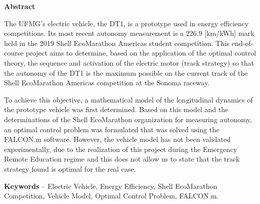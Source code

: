 
\begin{center}
\huge{{\bf Abstract}}
\vspace{2cm}
\end{center}

The UFMG's electric vehicle, the DT1, is a prototype used in energy efficiency competitions. 
Its most recent autonomy measurement is a $226.9$ [km/kWh] mark held in the 2019 Shell EcoMarathon Americas student competition. 
This end-of-course project aims to determine, based on the application of the optimal control theory, the sequence and activation of the electric motor 
(track strategy) so that the autonomy of the DT1 is the maximum possible on the current track of the Shell EcoMarathon Americas competition at the Sonoma raceway.

To achieve this objective, a mathematical model of the longitudinal dynamics of the prototype vehicle was first determined. 
Based on this model and the determinations of the Shell EcoMarathon organization for measuring autonomy, an optimal control problem was formulated that 
was solved using the FALCON.m software. However, the vehicle model has not been validated experimentally, due to the realization of this project during 
the Emergency Remote Education regime and this does not allow us to state that the track strategy found is optimal for the real case.

\textbf{Keywords} -- Electric Vehicle, Energy Efficiency, Shell EcoMarathon Competition, Vehicle Model, Optimal Control Problem, FALCON.m.

 
\clearpage
\thispagestyle{empty}
\cleardoublepage

